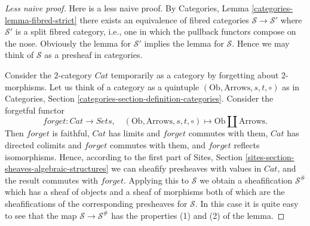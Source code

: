 \begin{proof}[Less naive proof]
Here is a less naive proof.
By Categories, Lemma \ref{categories-lemma-fibred-strict}
there exists an equivalence of
fibred categories $\mathcal{S} \to \mathcal{S}'$ where $\mathcal{S}'$
is a split fibred category, i.e., one in which the pullback
functors compose on the nose. Obviously the lemma for $\mathcal{S}'$
implies the lemma for $\mathcal{S}$. Hence we may think of $\mathcal{S}$
as a presheaf in categories.

\medskip\noindent
Consider the $2$-category $\textit{Cat}$ temporarily as a
category by forgetting about $2$-morphisms.
Let us think of a category as a quintuple
$(\text{Ob}, \text{Arrows}, s, t, \circ)$ as in
Categories, Section \ref{categories-section-definition-categories}.
Consider the forgetful functor
$$
forget : \textit{Cat} \to \textit{Sets}, \quad
(\text{Ob}, \text{Arrows}, s, t, \circ)
\mapsto
\text{Ob} \coprod \text{Arrows}.
$$
Then $forget$ is faithful, $\textit{Cat}$ has limits and
$forget$ commutes with them, $\textit{Cat}$ has directed colimits and
$forget$ commutes with them, and $forget$ reflects isomorphisms.
Hence, according to the first part of
Sites, Section \ref{sites-section-sheaves-algebraic-structures}
we can sheafify presheaves with values in $\textit{Cat}$, and
the result commutes with $forget$. Applying this to
$\mathcal{S}$ we obtain a sheafification $\mathcal{S}^\#$
which has a sheaf of objects and a sheaf of morphisms
both of which are the sheafifications of the corresponding
presheaves for $\mathcal{S}$. In this case it is quite
easy to see that the map $\mathcal{S} \to \mathcal{S}^\#$
has the properties (1) and (2) of the lemma.


\end{proof}
